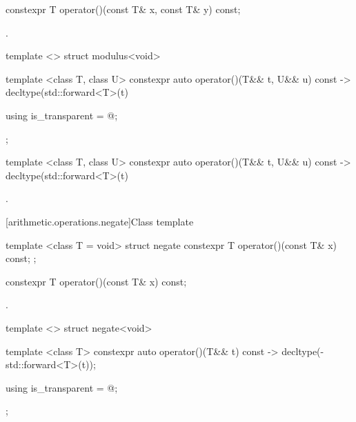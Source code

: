 %
\begin{itemdecl}
constexpr T operator()(const T& x, const T& y) const;
\end{itemdecl}

\begin{itemdescr}
\pnum\returns {}.
\end{itemdescr}

%
\begin{itemdecl}
template <> struct modulus<void> {
  template <class T, class U> constexpr auto operator()(T&& t, U&& u) const
    -> decltype(std::forward<T>(t) %

  using is_transparent = @\unspec@;
};
\end{itemdecl}

%
\begin{itemdecl}
template <class T, class U> constexpr auto operator()(T&& t, U&& u) const
    -> decltype(std::forward<T>(t) %
\end{itemdecl}

\begin{itemdescr}
\pnum\returns {}.
\end{itemdescr}

[arithmetic.operations.negate]{Class template }

%
\begin{itemdecl}
template <class T = void> struct negate {
  constexpr T operator()(const T& x) const;
};
\end{itemdecl}

%
\begin{itemdecl}
constexpr T operator()(const T& x) const;
\end{itemdecl}

\begin{itemdescr}
\pnum\returns {}.
\end{itemdescr}

%
\begin{itemdecl}
template <> struct negate<void> {
  template <class T> constexpr auto operator()(T&& t) const
    -> decltype(-std::forward<T>(t));

  using is_transparent = @\unspec@;
};
\end{itemdecl}

